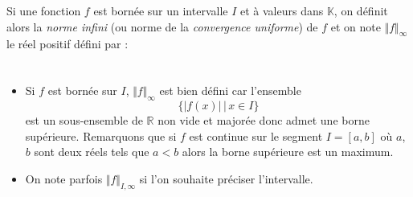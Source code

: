 \documentclass[french,11pt,twoside]{VcCours}
\begin{document}


\begin{Definition}{} Si une fonction $f$ est bornée sur un intervalle $I$ et à valeurs dans $\mathbb{K}$, on définit alors la \emph{norme infini} (ou norme de la \emph{convergence uniforme}) de $f$ et on note $\Vert f \Vert_{\infty}$ le réel positif défini par :
$$ \phantom{\Vert f \Vert_{\infty} = \sup_{x \in I} \vert f(x) \vert} $$
\end{Definition}

\begin{Remarques}{}
\begin{itemize} 
\item Si $f$ est bornée sur $I$, $\Vert f \Vert_{\infty}$ est bien défini car l'ensemble 
$$ \lbrace \vert f(x) \vert \, \vert \, x \in I \rbrace$$
est un sous-ensemble de $\mathbb{R}$ non vide et majorée donc admet une borne supérieure. Remarquons que si $f$ est continue sur le segment $I= [a,b]$ où $a$, $b$ sont deux réels tels que $a<b$ alors la borne supérieure est un maximum.
\item On note parfois $\Vert f \Vert_{I,\infty}$ si l'on souhaite préciser l'intervalle.
\end{itemize}
\end{Remarques}{} 
\end{document}
